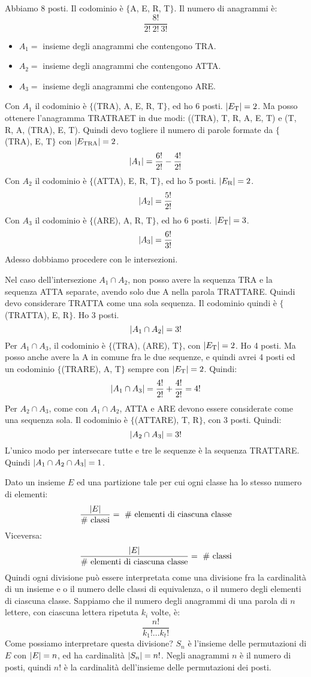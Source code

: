 Abbiamo 8 posti. Il codominio \`e $\{$A, E, R, T$\}$. Il numero di anagrammi \`e:
\[
\frac{8!}{2! \ 2! \ 3!}
\]
\begin{itemize}
  \item $A_1 = $ insieme degli anagrammi che contengono TRA. 
  \item $A_2 = $ insieme degli anagrammi che contengono ATTA. 
  \item $A_3 = $ insieme degli anagrammi che contengono ARE. 
\end{itemize}
Con $A_1$ il codominio \`e $\{ $(TRA), A, E, R, T$\}$, ed ho 6 posti. $\left\lvert{E_{\text{T}}}\right\rvert = 2$. Ma posso ottenere l'anagramma TRATRAET in due modi: ((TRA), T, R, A, E, T) e (T, R, A, (TRA), E, T). Quindi devo togliere il numero di parole formate da $\{ $(TRA), E, T$\}$ con $\left\lvert{E_{\text{TRA}}}\right\rvert = 2$.
\[
\left\lvert{A_1}\right\rvert = \frac{6!}{2!} - \frac{4!}{2!}
\]
Con $A_2$ il codominio \`e $\{ $(ATTA), E, R, T$\}$, ed ho 5 posti. $\left\lvert{E_{\text{R}}}\right\rvert = 2$.
\[
\left\lvert{A_2}\right\rvert = \frac{5!}{2!}
\]
Con $A_3$ il codominio \`e $\{ $(ARE), A, R, T$\}$, ed ho 6 posti. $\left\lvert{E_{\text{T}}}\right\rvert = 3$.
\[
\left\lvert{A_3}\right\rvert = \frac{6!}{3!}
\]
Adesso dobbiamo procedere con le intersezioni.

Nel caso dell'intersezione $A_1 \cap A_2$, non posso avere la sequenza TRA e la sequenza ATTA separate, avendo solo due A nella parola TRATTARE. Quindi devo considerare TRATTA come una sola sequenza. Il codominio quindi \`e $\{ $(TRATTA), E, R$\}$. Ho 3 posti.
\[
\left\lvert{A_1 \cap A_2}\right\rvert = 3!
\] 
Per $A_1 \cap A_3$, il codominio \`e $\{ $(TRA), (ARE), T$\}$, con $\left\lvert{E_{\text{T}}}\right\rvert = 2$. Ho 4 posti. Ma posso anche avere la A in comune fra le due sequenze, e quindi avrei 4 posti ed un codominio $\{ $(TRARE), A, T$\}$ sempre con $\left\lvert{E_{\text{T}}}\right\rvert = 2$. Quindi:
\[
\left\lvert{A_1 \cap A_3}\right\rvert = \frac{4!}{2!} + \frac{4!}{2!} = 4!
\]
Per $A_2 \cap A_3$, come con $A_1 \cap A_2$, ATTA e ARE devono essere considerate come una sequenza sola. Il codominio \`e $\{$(ATTARE), T, R$\}$, con 3 posti. Quindi:
\[
\left\lvert{A_2 \cap A_3}\right\rvert = 3!
\]
L'unico modo per intersecare tutte e tre le sequenze \`e la sequenza TRATTARE. Quindi $\left\lvert{A_1 \cap A_2 \cap A_3}\right\rvert = 1$.


Dato un insieme $E$ ed una partizione tale per cui ogni classe ha lo stesso numero di elementi:
\[
\frac{\left\lvert{E}\right\rvert}{\text{\# classi}} = \text{ \# elementi di ciascuna classe}
\]
Viceversa:
\[
\frac{\left\lvert{E}\right\rvert}{\text{\# elementi di ciascuna classe}} = \text{ \# classi}
\]
Quindi ogni divisione pu\`o essere interpretata come una divisione fra la cardinalit\`a di un insieme e o il numero delle classi di equivalenza, o il numero degli elementi di ciascuna classe. Sappiamo che il numero degli anagrammi di una parola di $n$ lettere, con ciascuna lettera ripetuta $k_i$ volte, \`e:
\[
\frac{n!}{k_1! \dots k_t!}
\]
Come possiamo interpretare questa divisione? $S_n$ \`e l'insieme delle permutazioni di $E$ con $\left\lvert{E}\right\rvert = n$, ed ha cardinalit\`a $\left\lvert{S_n}\right\rvert = n!$. Negli anagrammi $n$ \`e il numero di posti, quindi $n!$ \`e la cardinalit\`a dell'insieme delle permutazioni dei posti. 

